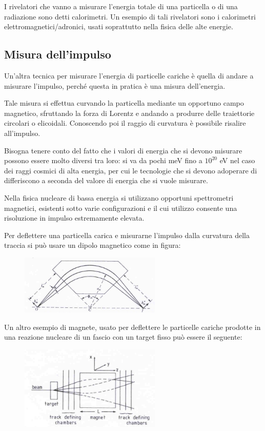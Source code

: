 I rivelatori che vanno a misurare l'energia totale di una particella o di una radiazione sono detti calorimetri. Un esempio di tali rivelatori sono i calorimetri elettromagnetici/adronici, usati soprattutto nella fisica delle alte energie.

\subsection{Misura dell'impulso}
Un'altra tecnica per misurare l'energia di particelle cariche è quella di andare a misurare l'impulso, perché questa in pratica è una misura dell'energia.

Tale misura si effettua curvando la particella mediante un opportuno campo magnetico, sfruttando la forza di Lorentz e andando a produrre delle traiettorie circolari o elicoidali. Conoscendo poi il raggio di curvatura è possibile risalire all'impulso.

Bisogna tenere conto del fatto che i valori di energia che si devono misurare possono essere molto diversi tra loro: si va da pochi meV fino a $10^{20}$ eV nel caso dei raggi cosmici di alta energia, per cui le tecnologie che si devono adoperare di differiscono a seconda del valore di energia che si vuole misurare.

Nella fisica nucleare di bassa energia si utilizzano opportuni spettrometri magnetici, esistenti sotto varie configurazioni e il cui utilizzo consente una risoluzione in impulso estremamente elevata.

Per deflettere una particella carica e misurarne l'impulso dalla curvatura della traccia si può usare un dipolo magnetico come in figura:

\begin{figure}[H]
   \centering
   \includegraphics[width=0.6\textwidth]{immagini/dipolo_magnetico_impulso.png}
\end{figure}

Un altro esempio di magnete, usato per deflettere le particelle cariche prodotte in una reazione nucleare di un fascio con un target fisso può essere il seguente:

\begin{figure}[H]
   \centering
   \includegraphics[width=0.6\textwidth]{immagini/magnete_misura_impulso.png}
\end{figure}

